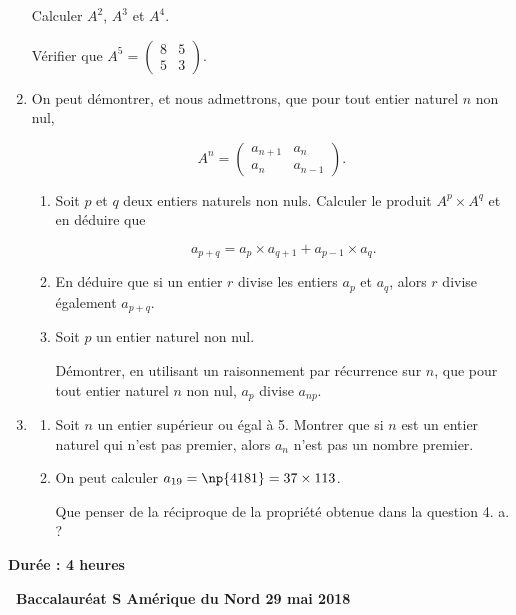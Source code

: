 \documentclass[10pt,a4paper]{article}
\begin{document}
\begin{enumerate}
Calculer $A^2$, $A^3$ et $A^4$. 

Vérifier que $A^5 = \begin{pmatrix}8&5\\5&3\end{pmatrix}$.
\item On peut démontrer, et nous admettrons, que pour tout entier naturel $n$ non nul,

\[A^n = \begin{pmatrix}a_{n+1}&a_n\\a_n&a_{n-1}\end{pmatrix}.\]

	\begin{enumerate}
		\item Soit $p$ et $q$ deux entiers naturels non nuls. Calculer le produit $A^p \times A^q$ et en déduire que
		
		\[a_{p+q} = a_p \times a_{q+1} + a_{p-1} \times a_q.\]
		
		\item  En déduire que si un entier $r$ divise les entiers $a_p$ et $a_q$, alors $r$ divise également $a_{p+q}$.
		\item  Soit $p$ un entier naturel non nul.
		
Démontrer, en utilisant un raisonnement par récurrence sur $n$, que pour tout entier naturel
$n$ non nul, $a_p$ divise $a_{np}$.
	\end{enumerate}
\item 
	\begin{enumerate}
		\item Soit $n$ un entier supérieur ou égal à 5. Montrer que si $n$ est un entier naturel qui n'est pas premier, alors $a_n$ n'est pas un nombre premier.
		\item On peut calculer $a_{19} = \np{4181} = 37 \times 113$.
		
Que penser de la réciproque de la propriété obtenue dans la question 4. a. ?
	\end{enumerate}
\end{enumerate}
\newpage
\hypertarget{AmeriqueNord}{}

\label{AmeriqueNord}
\pagestyle{fancy}
\thispagestyle{empty}
\begin{center}\textbf{Durée : 4 heures}

\vspace{0,5cm}

{\Large \textbf{\decofourleft~Baccalauréat S Amérique du Nord 29 mai 2018~\decofourright}}
\end{center}
\end{document}
